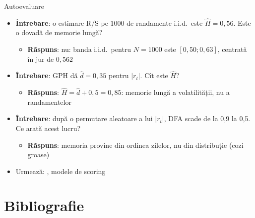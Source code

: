 \begin{frame}{Autoevaluare}
\itemsize{\footnotesize}
\begin{itemize}
    \item \textbf{Întrebare}: o estimare R/S pe 1000 de randamente i.i.d.\ este $\hat H = 0{,}56$. Este o dovadă de memorie lungă?
    \begin{itemize}
        \item \textbf{Răspuns}: nu: banda i.i.d.\ pentru $N = 1000$ este $[0{,}50; 0{,}63]$, centrată în jur de $0{,}562$
    \end{itemize}
    \item \textbf{Întrebare}: GPH dă $\hat d = 0{,}35$ pentru $|r_t|$. Cît este $\hat H$?
    \begin{itemize}
        \item \textbf{Răspuns}: $\hat H = \hat d + 0{,}5 = 0{,}85$: memorie lungă a volatilității, nu a randamentelor
    \end{itemize}
    \item \textbf{Întrebare}: după o permutare aleatoare a lui $|r_t|$, DFA scade de la 0,9 la 0,5. Ce arată acest lucru?
    \begin{itemize}
        \item \textbf{Răspuns}: memoria provine din ordinea zilelor, nu din distribuție (cozi groase)
    \end{itemize}
    \item Urmează: , modele de scoring
\end{itemize}
\end{frame}


\section{Bibliografie}


